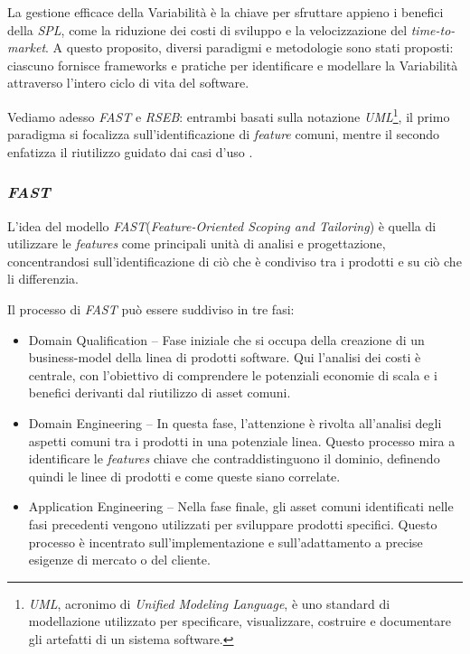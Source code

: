 \documentclass[12pt]{report}
\newcommand{\spl}{\textsl{SPL}\xspace}
\newcommand{\fast}{\textsl{FAST}\xspace}
\newcommand{\rseb}{\textsl{RSEB}\xspace}
\newcommand{\uml}{\textsl{UML}\xspace}
\begin{document}
La gestione efficace della Variabilità è la chiave per sfruttare appieno i benefici della \spl, come la riduzione dei costi di sviluppo e la velocizzazione del \textit{time-to-market}. A questo proposito, diversi paradigmi e metodologie sono stati proposti: ciascuno fornisce frameworks e pratiche per identificare e modellare la Variabilità attraverso l'intero ciclo di vita del software.

Vediamo adesso \fast e \rseb: entrambi basati sulla notazione \uml\footnote{\uml, acronimo di \textit{Unified Modeling Language}, è uno standard di modellazione utilizzato per specificare, visualizzare, costruire e documentare gli artefatti di un sistema software.}, il primo paradigma si focalizza sull'identificazione di \textit{feature} comuni, mentre il secondo enfatizza il riutilizzo guidato dai casi d'uso \cite{griss:favaro:alessandro, harsu}.


\subsubsection{\fast}
L'idea del modello \fast (\textit{Feature-Oriented Scoping and Tailoring}) \cite{harsu} è quella di utilizzare le \textit{features} come principali unità di analisi e progettazione, concentrandosi sull'identificazione di ciò che è condiviso tra i prodotti e su ciò che li differenzia.

Il processo di \fast può essere suddiviso in tre fasi:

\begin{itemize}
\item \textsf{Domain Qualification} -- Fase iniziale che si occupa della creazione di un business-model della linea di prodotti software. Qui l'analisi dei costi è centrale, con l'obiettivo di comprendere le potenziali economie di scala e i benefici derivanti dal riutilizzo di asset comuni.
\item \textsf{Domain Engineering} -- In questa fase, l'attenzione è rivolta all'analisi degli aspetti comuni tra i prodotti in una potenziale linea. Questo processo mira a identificare le \textit{features} chiave che contraddistinguono il dominio, definendo quindi le linee di prodotti e come queste siano correlate.
\item \textsf{Application Engineering} -- Nella fase finale, gli asset comuni identificati nelle fasi precedenti vengono utilizzati per sviluppare prodotti specifici. Questo processo è incentrato sull'implementazione e sull'adattamento a precise esigenze di mercato o del cliente.
\end{itemize}
\end{document}
